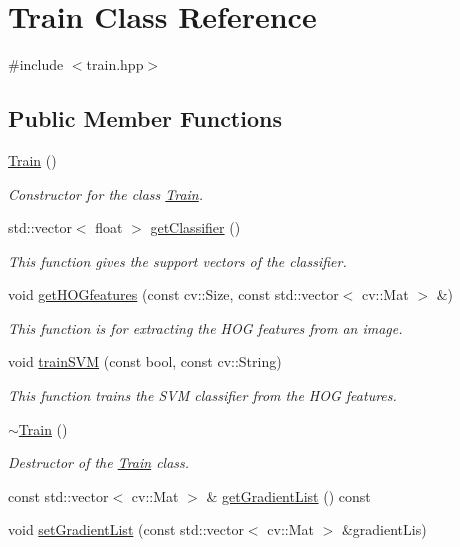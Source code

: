 \hypertarget{classTrain}{}\section{Train Class Reference}
\label{classTrain}


{\ttfamily \#include $<$train.\+hpp$>$}

\subsection*{Public Member Functions}
\begin{DoxyCompactItemize}
\item 
\hyperlink{classTrain_aa05ce5a8ff68dea76d457f4ff2d0d1ba}{Train} ()
\begin{DoxyCompactList}\small\item\em Constructor for the class \hyperlink{classTrain}{Train}. \end{DoxyCompactList}\item 
std\+::vector$<$ float $>$ \hyperlink{classTrain_a72251742e0ed3d4871dffe8a05ebbc8c}{get\+Classifier} ()
\begin{DoxyCompactList}\small\item\em This function gives the support vectors of the classifier. \end{DoxyCompactList}\item 
void \hyperlink{classTrain_a6a98a6bbafe06950a62d5825a7eda62f}{get\+H\+O\+Gfeatures} (const cv\+::\+Size, const std\+::vector$<$ cv\+::\+Mat $>$ \&)
\begin{DoxyCompactList}\small\item\em This function is for extracting the H\+OG features from an image. \end{DoxyCompactList}\item 
void \hyperlink{classTrain_a7a7755ffab3240048df164cb4dff409c}{train\+S\+VM} (const bool, const cv\+::\+String)
\begin{DoxyCompactList}\small\item\em This function trains the S\+VM classifier from the H\+OG features. \end{DoxyCompactList}\item 
\hyperlink{classTrain_a28c78c0d21e7fbce79cb94927f23c11e}{$\sim$\+Train} ()
\begin{DoxyCompactList}\small\item\em Destructor of the \hyperlink{classTrain}{Train} class. \end{DoxyCompactList}\item 
const std\+::vector$<$ cv\+::\+Mat $>$ \& \hyperlink{classTrain_a5d4a82b27e9ee2d51d87741db5accb88}{get\+Gradient\+List} () const 
\item 
void \hyperlink{classTrain_aa5b39906a0070d525bdf88bc315d2086}{set\+Gradient\+List} (const std\+::vector$<$ cv\+::\+Mat $>$ \&gradient\+Lis)
\end{DoxyCompactItemize}
